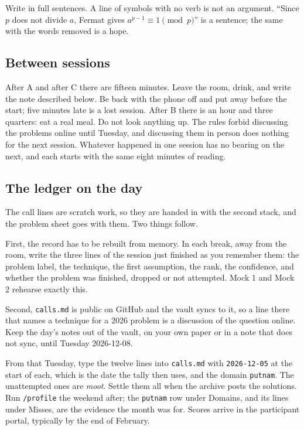 Write in full sentences. A line of symbols with no verb is not an argument. ``Since $p$ does not divide $a$, Fermat gives $a^{p-1} \equiv 1 \pmod p$'' is a sentence; the same with the words removed is a hope.

\subsection*{Between sessions}

After A and after C there are fifteen minutes. Leave the room, drink, and write the note described below. Be back with the phone off and put away before the start; five minutes late is a lost session. After B there is an hour and three quarters: eat a real meal. Do not look anything up. The rules forbid discussing the problems online until Tuesday, and discussing them in person does nothing for the next session. Whatever happened in one session has no bearing on the next, and each starts with the same eight minutes of reading.

\subsection*{The ledger on the day}

The call lines are scratch work, so they are handed in with the second stack, and the problem sheet goes with them. Two things follow.

First, the record has to be rebuilt from memory. In each break, away from the room, write the three lines of the session just finished as you remember them: the problem label, the technique, the first assumption, the rank, the confidence, and whether the problem was finished, dropped or not attempted. Mock 1 and Mock 2 rehearse exactly this.

Second, \texttt{calls.md} is public on GitHub and the vault syncs to it, so a line there that names a technique for a 2026 problem is a discussion of the question online. Keep the day's notes out of the vault, on your own paper or in a note that does not sync, until Tuesday 2026-12-08.

From that Tuesday, type the twelve lines into \texttt{calls.md} with \texttt{2026-12-05} at the start of each, which is the date the tally then uses, and the domain \texttt{putnam}. The unattempted ones are \emph{moot}. Settle them all when the archive posts the solutions. Run \texttt{/profile} the weekend after; the \texttt{putnam} row under Domains, and its lines under Misses, are the evidence the month was for. Scores arrive in the participant portal, typically by the end of February.

